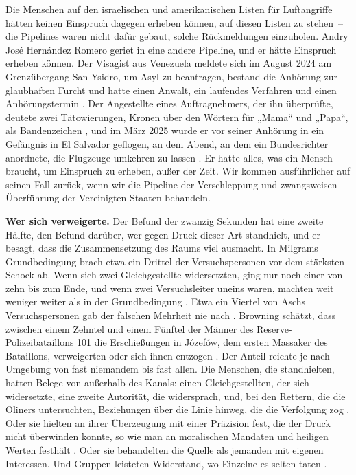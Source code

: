 Die Menschen auf den israelischen und amerikanischen Listen für Luftangriffe hätten keinen Einspruch dagegen erheben können, auf diesen Listen zu stehen~– die Pipelines waren nicht dafür gebaut, solche Rückmeldungen einzuholen. Andry José Hernández Romero geriet in eine andere Pipeline, und er hätte Einspruch erheben können. Der Visagist aus Venezuela meldete sich im August 2024 am Grenzübergang San Ysidro, um Asyl zu beantragen, bestand die Anhörung zur glaubhaften Furcht und hatte einen Anwalt, ein laufendes Verfahren und einen Anhörungstermin \autocite{LULAC2025HernandezRomero,Vega2025HernandezRomero}. Der Angestellte eines Auftragnehmers, der ihn überprüfte, deutete zwei Tätowierungen, Kronen über den Wörtern für „Mama“ und „Papa“, als Bandenzeichen \autocite{Palomera2025Blade}, und im März 2025 wurde er vor seiner Anhörung in ein Gefängnis in El Salvador geflogen, an dem Abend, an dem ein Bundesrichter anordnete, die Flugzeuge umkehren zu lassen \autocite{jgg2025contempt}. Er hatte alles, was ein Mensch braucht, um Einspruch zu erheben, außer der Zeit. Wir kommen ausführlicher auf seinen Fall zurück, wenn wir die Pipeline der Verschleppung und zwangsweisen Überführung der Vereinigten Staaten behandeln.

\textbf{Wer sich verweigerte.} Der Befund der zwanzig Sekunden hat eine zweite Hälfte, den Befund darüber, wer gegen Druck dieser Art standhielt, und er besagt, dass die Zusammensetzung des Raums viel ausmacht. In Milgrams Grundbedingung brach etwa ein Drittel der Versuchspersonen vor dem stärksten Schock ab. Wenn sich zwei Gleichgestellte widersetzten, ging nur noch einer von zehn bis zum Ende, und wenn zwei Versuchsleiter uneins waren, machten weit weniger weiter als in der Grundbedingung \autocite{milgram1974obedience}. Etwa ein Viertel von Aschs Versuchspersonen gab der falschen Mehrheit nie nach \autocite{asch1956studies}. Browning schätzt, dass zwischen einem Zehntel und einem Fünftel der Männer des Reserve-Polizeibataillons 101 die Erschießungen in Józefów, dem ersten Massaker des Bataillons, verweigerten oder sich ihnen entzogen \autocite{browning1992ordinary}. Der Anteil reichte je nach Umgebung von fast niemandem bis fast allen. Die Menschen, die standhielten, hatten Belege von außerhalb des Kanals: einen Gleichgestellten, der sich widersetzte, eine zweite Autorität, die widersprach, und, bei den Rettern, die die Oliners untersuchten, Beziehungen über die Linie hinweg, die die Verfolgung zog \autocite{oliner1988altruistic}. Oder sie hielten an ihrer Überzeugung mit einer Präzision fest, die der Druck nicht überwinden konnte, so wie man an moralischen Mandaten und heiligen Werten festhält \autocite{skitka2009limits,ginges2007sacred}. Oder sie behandelten die Quelle als jemanden mit eigenen Interessen. Und Gruppen leisteten Widerstand, wo Einzelne es selten taten \autocite{gamson1982encounters}.

